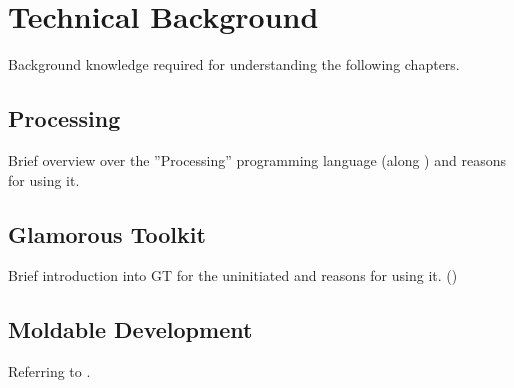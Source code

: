 
\chapter{Technical Background} \label{ch_background}
Background knowledge required for understanding the following chapters.

\section{Processing} \label{sc_processing}
Brief overview over the ''Processing'' programming language (along \cite{Cas14}) and reasons for using it.

\section{Glamorous Toolkit} \label{sc_gt}
Brief introduction into GT for the uninitiated and reasons for using it. (\cite{Gir23})

\section{Moldable Development}
Referring to \cite{Nie24}.
